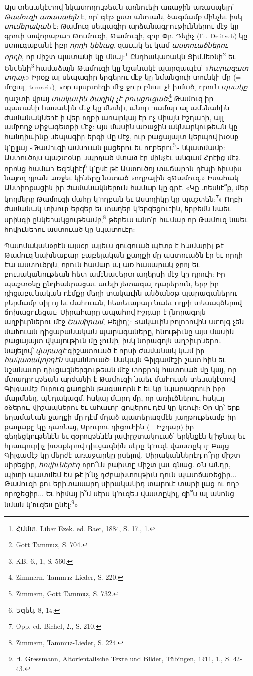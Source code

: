 \documentclass{article}
\begin{document}
{Այս տեսակէտով նկատողութեան առնուելի առաջին առասպելր՝ \emph{Թամուզի առասպելն} է, որ՝ գէթ ըստ անուան, ծագմամբ մինչեւ իսկ \emph{սումերական} է: Թամուզ սեպագիր արձանագրութիւններու մէջ կը գրուի սովորաբար Թումուզի, Թամուզի, զոր Փր. Դելիչ (Fr. Delitsch) կը ստուգաբանէ իբր \emph{որդի կենաց}, զաւակ եւ կամ \emph{աստուածներու որդի}, որ միշտ պատանի կը մնայ:\footnote{Հմմտ. Liber Ezek. ed. Baer, 1884, S. 17., 1.} Ընդհակառակն Ցիմմեռնի\footnote{Gott Tammuz, S. 704.} եւ Ենսենի\footnote{KB. 6., 1, S. 560.} համաձայն Թամուզի կը նշանակէ պարզապէս՝ «\emph{հարազատ տղայ}:» Իրօք ալ սեպագիր երգերու մէջ կը նմանցուի տունկի մը (= մոշայ, tamarix), «որ պարտէզի մէջ ջուր բնաւ չէ խմած, որուն \emph{պսակը} դաշտի վրայ \emph{տակաւին ծաղիկ չէ բուսցուցած}:\footnote{Zimmern, Tammuz-Lieder, S. 220.} Թամուզ իր պատանի հասակին մէջ կը մեռնի, անոր համար ալ ամենահին ժամանակներէ ի վեր ողբի առարկայ էր ոչ միայն Իշդարի, այլ ամբողջ Միջագետքի մէջ: Այս մասին առաջին ակնարկութեան կը հանդիպինք սեպագիր երգի մը մէջ, ուր բացայայտ կերպով խօսք կ'ըլլայ «Թամուզի ամսուան լացերու եւ ողբերու\footnote{Zimmern, Gott Tammuz, S. 732.}» նկատմամբ: Աստուծոյս պաշտօնը սպրդած մտած էր մինչեւ անգամ Հրէից մէջ, որոնց համար Եզեկիէլ\footnote{Եզեկ. 8, 14:} կ'ըսէ թէ Աստուծոյ տաճարին դէպի հիւսիս նայող դրան առջեւ կիները նստած «ողբային զԹամուզ:» Իսահակ Անտիոքացին իր ժամանակներուն համար կը գրէ. «Կը տեսնէ՞ք, մեր կողմերը Թամուզի մահը կ'ողբան եւ Աստղիկը կը պաշտեն:\footnote{Opp. ed. Bichel, 2., S. 210.}» Ողբի ժամանակ տխուր երգեր եւ տաղեր կ'երգեցուէին, երբեմն նաեւ սրինգի ընկերակցութեամբ,\footnote{Zimmern, Tammuz-Lieder, S. 224.} թերեւս անո՛ր համար որ Թամուզ նաեւ հովիւներու աստուած կը նկատուէր:

Պատմականօրէն այսօր այլեւս ցուցուած պէտք է համարիլ թէ Թամուզ նախնաբար բաբելական քաղքի մը աստուածն էր եւ որդի Էա աստուծրյն, որուն համար ալ առ հասարակ ջրոյ եւ բուսականութեան հետ ամէնասերտ աղերսի մէջ կը դրուի: Իր պաշտօնը ընդհանրացաւ աւելի յետագայ դարերուն, երբ իր դիցաբանական դէմքը մեղի տակաւին անծանօթ պարագաներու բերմամբ սիրոյ եւ մահուան, հետեւաբար նաեւ ողբի տեսագծերով ճոխացուեցաւ: Սիրահարը ապահով Իշդար է (նորագոյն աղբիւրներու մէջ \emph{Շամիրամ}, Բելիդ): Տակաւին բոլորովին ստոյգ չեն մահուան դիցաբանական պարագաները, հնութիւնը այս մասին բացայայտ վկայութիւն մը չունի, իսկ նորագոյն աղբիւրներու նայելով՝ \emph{վարազէ} գիշատուած է որսի ժամանակ կամ իր \emph{հակառակորդէն} սպաննուած: Սակայն Գիլգամէշի շատ հին եւ նշանաւոր դիւցազներգութեան մէջ փոքրիկ հատուած մը կայ, որ մտադրութեան արժանի է Թամուզի նաեւ մահուան տեսակէտով: Գիլգամէշ Ուրուգ քաղքին թագաւորն է եւ կը նկարագրուի իբր մարմնեղ, պնդակազմ, հսկայ մարդ մը, որ առիւծներու, հսկայ օձերու, վիշապներու եւ ահաւոր ցուլերու դէմ կը կռուի: Օր մը՝ երբ եղամական քաղքի մը դէմ մղած պատերազմէն յաղթութեամբ իր քաղաքը կը դառնայ, Արուրու դիցուհին (= Իշդար) իր գեղեցկութենէն եւ զօրութենէն յափըշտակուած՝ երկնքէն կ'իջնայ եւ հրապուրիչ խօսքերով դիւցազնին սէրը կ'ուզէ վաստըկիլ: Բայց Գիլգամէշ կը մերժէ առաջարկը ըսելով. Սիրականներէդ ո՞րը միշտ սիրեցիր, \emph{հովիւներէդ} որո՞ւն բախտը միշտ լաւ գնաց. օ՛ն անդր, պիտի պատմեմ ես թէ ի՛նչ դժբախտութիւն դուն պատճառեցիր... Թամուզի քու երիտասարդ սիրականիդ տարուէ տարի լաց ու ողբ որոշեցիր... Եւ հիմայ ի՞մ սէրս կ'ուզես վաստըկիլ, զի՞ս ալ անոնց նման կ'ուզես ընել:\footnote{H. Gressmann, Altorientalische Texte und Bilder, Tübingen, 1911, 1., S. 42-43.}»

}
\end{document}
